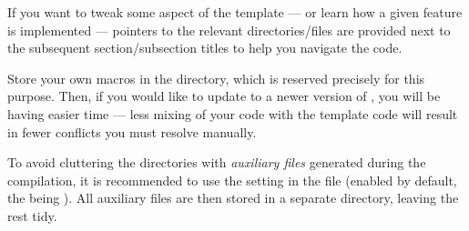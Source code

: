 \begin{figure}[!ht]
{%
    }
\end{figure}

\begin{remark}
    If you want to tweak some aspect of the template --- or learn how a given feature is implemented --- pointers to the relevant directories/files are provided next to the subsequent section/subsection titles to help you navigate the code.
\end{remark}

\begin{remark}
    Store your own macros in the  directory, which is reserved precisely for this purpose.
    Then, if you would like to update to a newer version of \TeXtured{}, you will be having easier time --- less mixing of your code with the template code will result in fewer conflicts you must resolve manually.
\end{remark}

\begin{remark}
    To avoid cluttering the directories with \emph{auxiliary files} generated during the compilation, it is recommended to use the  setting in the  file (enabled by default, the  being ).
    All auxiliary files are then stored in a separate directory, leaving the rest tidy.
\end{remark}

